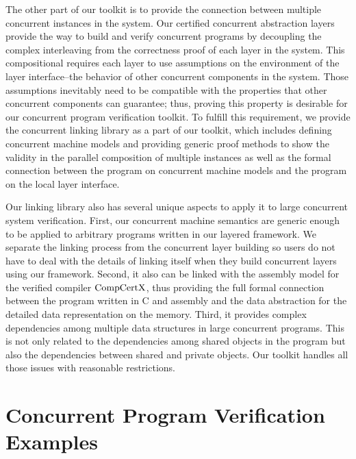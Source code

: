 The other part of our toolkit is to provide the connection between multiple concurrent instances in the system. 
Our certified concurrent abstraction layers provide the way to build and verify concurrent programs by decoupling 
the complex interleaving from the correctness proof of each layer in the system. 
This compositional requires each layer to use assumptions on the environment of the layer interface--the behavior of other concurrent components 
in the system. 
Those assumptions inevitably need to be compatible with the properties that other concurrent components can guarantee; 
thus, proving this property is desirable for our concurrent program verification toolkit. To fulfill this requirement, 
we provide the concurrent linking library as a part of our toolkit, which includes defining concurrent machine 
models and providing generic proof methods to show the validity in the parallel composition of multiple instances as well as 
the formal connection between the program on concurrent machine models and the program on the local layer interface.

Our linking library also has several unique aspects to apply it to large concurrent system verification. 
First, our concurrent machine semantics are generic enough to be applied to arbitrary programs written in our layered framework. 
We separate the linking process from the concurrent layer building so users do not have to deal with the details of linking itself when they 
build concurrent layers using our framework. Second, it also can be linked with the assembly model for the verified compiler $\mathrm{CompCertX}$, thus
 providing the full formal connection between the program written in C and assembly and the data abstraction for the detailed data 
 representation on the memory. Third, it provides complex dependencies among multiple data structures in large concurrent programs. 
 This is not only related to the dependencies among shared objects in the program but also the dependencies between 
 shared and private objects. Our toolkit handles all those issues with reasonable restrictions.

\section{Concurrent Program Verification Examples}
\label{chapter:introduction:sec:concurrent-program-verification-examples}


